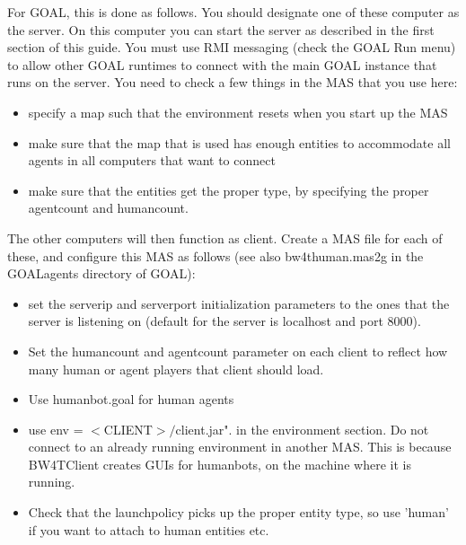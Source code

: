 \documentclass[11pt,a4paper]{article}
\begin{document}
For GOAL, this is done as follows. You should designate one of these computer as the server. On this computer you can start the server as described in the first section of this guide. You must use RMI messaging (check the GOAL Run menu) to allow other GOAL runtimes to connect with the main GOAL instance that runs on the server.
You need to check a few things in the MAS that you use here:
\begin{itemize}
\item specify a map such that the environment resets when you start up the MAS
\item make sure that the map that is used has enough entities to accommodate all agents in all computers that want to connect
\item make sure that the entities get the proper type, by specifying the proper agentcount and humancount.
\end{itemize}
The other computers will then function as client. Create a MAS file for each of these, and configure this MAS as follows (see also bw4thuman.mas2g in the GOALagents directory of GOAL):
\begin{itemize}
\item set the serverip and serverport initialization parameters to the ones that the server is listening on (default for the server is localhost and port 8000).
\item Set the humancount and agentcount parameter on each client to reflect how many human or agent players that client should load.
\item Use humanbot.goal for human agents
\item use env = $<$CLIENT$>/$client.jar". in the environment section. Do not connect to an already running environment in another MAS. This is because BW4TClient creates GUIs for humanbots, on the machine where it is running.
\item Check that the launchpolicy picks up the proper entity type, so use 'human' if you want to attach to human entities etc.
\end{itemize} 
\end{document}
